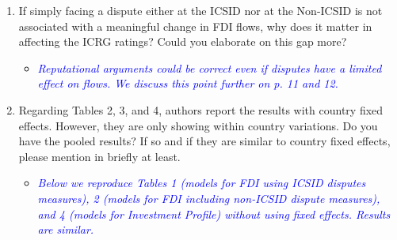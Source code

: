 \begin{enumerate}
	\item If simply facing a dispute either at the ICSID nor at the Non-ICSID is not associated with a meaningful change in FDI flows, why does it matter in affecting the ICRG ratings? Could you elaborate on this gap more?	
	\begin{itemize}
		\item \textcolor{blue}{ \emph{
		Reputational arguments could be correct even if disputes have a limited effect on flows. We discuss this point further on p. 11 and 12.
		}}
	\end{itemize}
	\item Regarding Tables 2, 3, and 4, authors report the results with country fixed effects. However, they are only showing within country variations. Do you have the pooled results? If so and if they are similar to country fixed effects, please mention in briefly at least.
	\begin{itemize}
		\item \textcolor{blue}{ \emph{ Below we reproduce Tables 1 (models for FDI using ICSID disputes measures), 2 (models for FDI including non-ICSID dispute measures), and 4 (models for Investment Profile) without using fixed effects. Results are similar.  }}


\end{itemize}
\end{enumerate}
